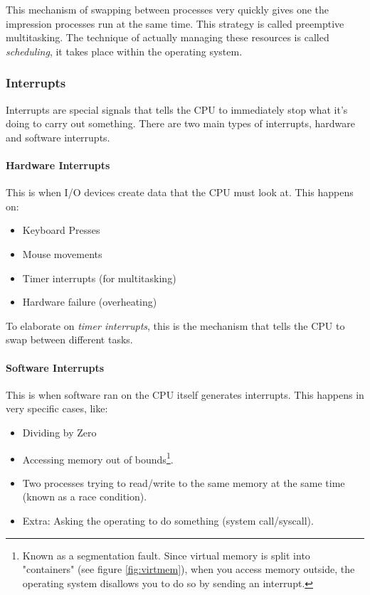 \documentclass[../main.tex]{subfiles}
\begin{document}
This mechanism of swapping between processes very quickly gives one the impression processes run at the same time. This strategy is called preemptive multitasking. The technique of actually managing these resources is called \emph{scheduling}, it takes place within the operating system.

\subsubsection{Interrupts}
\label{4:sec:interrupts}

Interrupts are special signals that tells the CPU to immediately stop what it's doing to carry out something. There are two main types of interrupts, hardware and software interrupts.

\paragraph{Hardware Interrupts}

This is when I/O devices create data that the CPU must look at. This happens on:

\begin{itemize}
    \item Keyboard Presses
    \item Mouse movements
    \item Timer interrupts (for multitasking)
    \item Hardware failure (overheating)
\end{itemize}

To elaborate on \emph{timer interrupts}, this is the mechanism that tells the CPU to swap between different tasks.

\paragraph{Software Interrupts}

This is when software ran on the CPU itself generates interrupts. This happens in very specific cases, like:

\begin{itemize}
    \item Dividing by Zero
    \item Accessing memory out of bounds\footnote{Known as a segmentation fault. Since virtual memory is split into "containers" (see figure \ref{fig:virtmem}), when you access memory outside, the operating system disallows you to do so by sending an interrupt.}.
    \item Two processes trying to read/write to the same memory at the same time (known as a race condition).
    \item Extra: Asking the operating to do something (system call/syscall).
\end{itemize}
\end{document}
